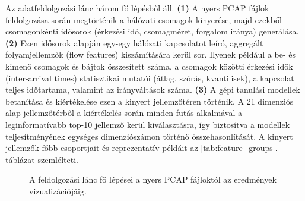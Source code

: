 \documentclass[a4paper,oneside]{article}
\begin{document}
Az adatfeldolgozási lánc három fő lépésből áll.
\textbf{(1)} A nyers PCAP fájlok feldolgozása során megtörténik a hálózati csomagok kinyerése, majd ezekből csomagonkénti idősorok (érkezési idő, csomagméret, forgalom iránya) generálása.
\textbf{(2)} Ezen idősorok alapján egy-egy hálózati kapcsolatot leíró, aggregált folyamjellemzők (flow features) kiszámítására kerül sor.
Ilyenek például a be- és kimenő csomagok és bájtok összesített száma, a csomagok közötti érkezési idők (inter-arrival times) statisztikai mutatói (átlag, szórás, kvantilisek), a kapcsolat teljes időtartama, valamint az irányváltások száma.
\textbf{(3)} A gépi tanulási modellek betanítása és kiértékelése ezen a kinyert jellemzőtéren történik.
A 21 dimenziós alap jellemzőtérből a kiértékelés során minden futás alkalmával a leginformatívabb top-10 jellemző kerül kiválasztásra, így biztosítva a modellek teljesítményének egységes dimenziószámon történő összehasonlítását.
A kinyert jellemzők főbb csoportjait és reprezentatív példáit az \ref{tab:feature_groups}. táblázat szemlélteti.
\begin{figure}[tbp]
    \centering
    \caption{A feldolgozási lánc fő lépései a nyers PCAP fájloktól az eredmények vizualizációjáig.}
    \label{fig:pipeline_overview}
\end{figure}
\end{document}
